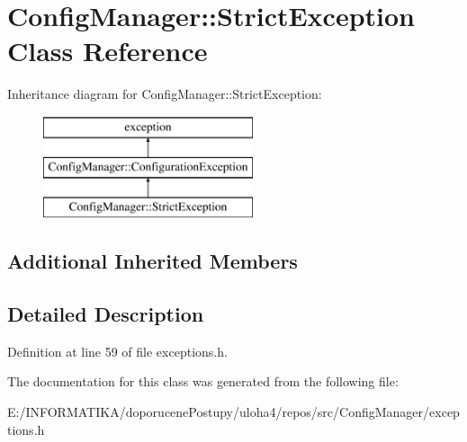 \hypertarget{class_config_manager_1_1_strict_exception}{}\section{Config\+Manager\+:\+:Strict\+Exception Class Reference}
\label{class_config_manager_1_1_strict_exception}
Inheritance diagram for Config\+Manager\+:\+:Strict\+Exception\+:\begin{figure}[H]
\begin{center}
\leavevmode
\includegraphics[height=3.000000cm]{class_config_manager_1_1_strict_exception}
\end{center}
\end{figure}
\subsection*{Additional Inherited Members}


\subsection{Detailed Description}


Definition at line 59 of file exceptions.\+h.



The documentation for this class was generated from the following file\+:\begin{DoxyCompactItemize}
\item 
E\+:/\+I\+N\+F\+O\+R\+M\+A\+T\+I\+K\+A/doporucene\+Postupy/uloha4/repos/src/\+Config\+Manager/exceptions.\+h\end{DoxyCompactItemize}
